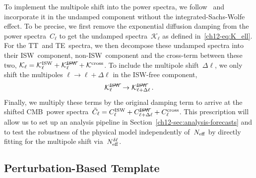 To implement the multipole shift into the power spectra, we follow~\cite{Follin:2015hya} and incorporate it in the undamped component without the integrated-Sachs-Wolfe effect. To be precise, we first remove the exponential diffusion damping from the power spectra~$C_\ell$ to get the undamped spectra~$\mathcal{K}_\ell$ as defined in~\eqref{ch12-eq:K_ell}. For the TT~and TE~spectra, we then decompose these undamped spectra into their ISW~component, \mbox{non-ISW}~component and the cross-term between these two, $\mathcal{K}_\ell = \mathcal{K}^\mathrm{ISW}_\ell + \mathcal{K}^{\cancel{\mathrm{ISW}}}_\ell + \mathcal{K}^\mathrm{cross}$. To include the multipole shift~$\Delta\ell$, we only shift the multipoles $\ell \to \ell + \Delta\ell$ in the ISW-free component,
\begin{equation}
	\mathcal{K}^{\cancel{\mathrm{ISW}}}_\ell \rightarrow \mathcal{K}^{\cancel{\mathrm{ISW}}}_{\ell + \Delta\ell}\, .	\label{ch12-eq:deltaell_data}
\end{equation}
Finally, we multiply these terms by the original damping term to arrive at the shifted CMB~power spectra~$\tilde{C}_\ell = C^\mathrm{ISW}_\ell + C^{\cancel{\mathrm{ISW}}}_{\ell + \Delta\ell} + C_\ell^\mathrm{cross}$. This prescription will allow us to set up an analysis pipeline in Section~\ref{ch12-sec:analysis-forecasts} and to test the robustness of the physical model independently of~$N_\mathrm{eff}$ by directly fitting for the multipole shift via~$N_\mathrm{eff}^{\delta\ell}$.


\subsection{Perturbation-Based Template}
\label{ch12-sec:perturbation-based-template}

